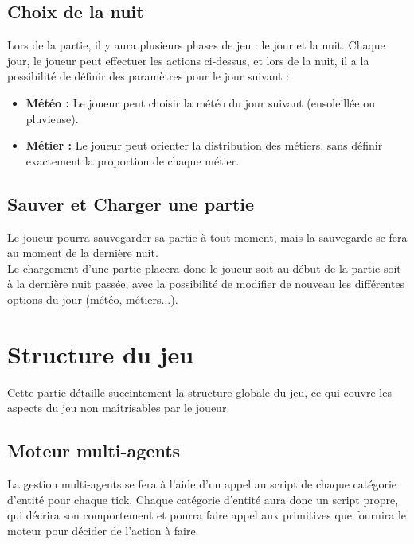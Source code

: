 \documentclass[a4paper]{memoir}
\begin{document}
			\subsection{Choix de la nuit}
				Lors de la partie, il y aura plusieurs phases de jeu : le jour et la nuit. Chaque jour, le joueur peut effectuer les actions ci-dessus, et lors de la nuit, il a la possibilité de définir des paramètres pour le jour suivant :
				\begin{itemize}[label=$\bullet$]
					\item \textbf{Météo :} Le joueur peut choisir la météo du jour suivant (ensoleillée ou pluvieuse).
					\item \textbf{Métier :} Le joueur peut orienter la distribution des métiers, sans définir exactement la proportion de chaque métier.
				\end{itemize}
		
			\subsection{Sauver et Charger une partie}
				Le joueur pourra sauvegarder sa partie à tout moment, mais la sauvegarde se fera au moment de la dernière nuit.\\
				Le chargement d'une partie placera donc le joueur soit au début de la partie soit à la dernière nuit passée, avec la possibilité de modifier de nouveau les différentes options du jour (météo, métiers...).
	
		\section{Structure du jeu}
			Cette partie détaille succintement la structure globale du jeu, ce qui couvre les aspects du jeu non maîtrisables par le joueur.
			
			\subsection{Moteur multi-agents}
				La gestion multi-agents se fera à l'aide d'un appel au script de chaque catégorie d'entité pour chaque tick. Chaque catégorie d'entité aura donc un script propre, qui décrira son comportement et pourra faire appel aux primitives que fournira le moteur pour décider de l'action à faire.
\end{document}
